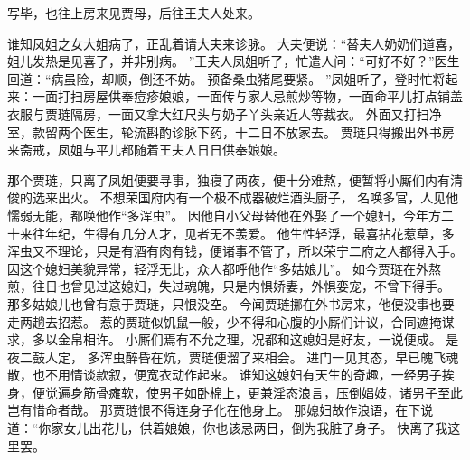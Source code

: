 \hop
写毕，也往上房来见贾母，后往王夫人处来。
\par
谁知凤姐之女大姐病了，正乱着请大夫来诊脉。
大夫便说：“替夫人奶奶们道喜，姐儿发热是见喜了，并非别病。
”王夫人凤姐听了，忙遣人问：“可好不好？”医生回道：“病虽险，却顺，倒还不妨。
预备桑虫猪尾要紧。
”凤姐听了，登时忙将起来：一面打扫房屋供奉痘疹娘娘，一面传与家人忌煎炒等物，一面命平儿打点铺盖衣服与贾琏隔房，一面又拿大红尺头与奶子丫头亲近人等裁衣。
外面又打扫净室，款留两个医生，轮流斟酌诊脉下药，十二日不放家去。
贾琏只得搬出外书房来斋戒，凤姐与平儿都随着王夫人日日供奉娘娘。
\par
那个贾琏，只离了凤姐便要寻事，独寝了两夜，便十分难熬，便暂将小厮们内有清俊的选来出火。
不想荣国府内有一个极不成器破烂酒头厨子，
名唤多官，人见他懦弱无能，都唤他作“多浑虫”。
因他自小父母替他在外娶了一个媳妇，今年方二十来往年纪，生得有几分人才，见者无不羡爱。
他生性轻浮，最喜拈花惹草，多浑虫又不理论，只是有酒有肉有钱，便诸事不管了，所以荣宁二府之人都得入手。
因这个媳妇美貌异常，轻浮无比，众人都呼他作“多姑娘儿”。
如今贾琏在外熬煎，往日也曾见过这媳妇，失过魂魄，只是内惧娇妻，外惧娈宠，不曾下得手。
那多姑娘儿也曾有意于贾琏，只恨没空。
今闻贾琏挪在外书房来，他便没事也要走两趟去招惹。
惹的贾琏似饥鼠一般，少不得和心腹的小厮们计议，合同遮掩谋求，多以金帛相许。
小厮们焉有不允之理，况都和这媳妇是好友，一说便成。
是夜二鼓人定，
多浑虫醉昏在炕，贾琏便溜了来相会。
进门一见其态，早已魄飞魂散，也不用情谈款叙，便宽衣动作起来。
谁知这媳妇有天生的奇趣，一经男子挨身，便觉遍身筋骨瘫软，使男子如卧棉上，更兼淫态浪言，压倒娼妓，诸男子至此岂有惜命者哉。
那贾琏恨不得连身子化在他身上。
那媳妇故作浪语，在下说道：“你家女儿出花儿，供着娘娘，你也该忌两日，倒为我脏了身子。
快离了我这里罢。
